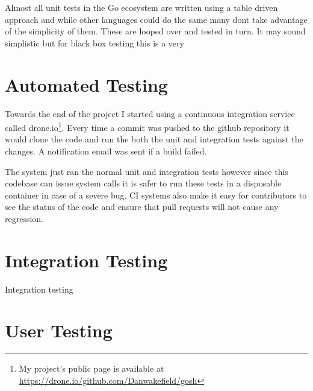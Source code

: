 Almost all unit tests in the Go ecosystem are written using a table driven approach and while other languages could do the same many dont take advantage of the simplicity of them.
These are looped over and tested in turn.
It may sound simplistic but for black box testing this is a very 

\section{Automated Testing}
Towards the end of the project I started using a continuous integration service called drone.io\footnote{My project's public page is available at \url{https://drone.io/github.com/Danwakefield/gosh}}.
Every time a commit was pushed to the github repository it would clone the code and run the both the unit and integration tests against the changes.
A notification email was sent if a build failed.

The system just ran the normal unit and integration tests however since this codebase can issue system calls it is safer to run these tests in a disposable container in case of a severe bug.  
CI systems also make it easy for contributors to see the status of the code and ensure that pull requests will not cause any regression.

\section{Integration Testing}
Integration testing 

\section{User Testing}















